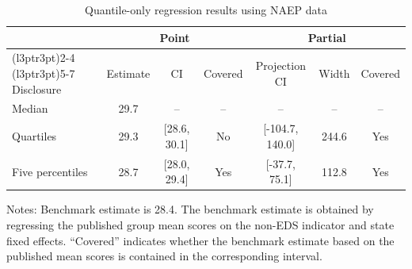 \begin{table}[!h]
\centering
\begin{threeparttable}
\caption{\label{tab:naep_qonlyreg}Quantile-only regression results using NAEP data}
\centering
{
\renewcommand{\arraystretch}{1.8}
\begin{tabular}[t]{lcccccc}
\toprule
\multicolumn{1}{c}{ } & \multicolumn{3}{c}{Point} & \multicolumn{3}{c}{Partial} \\
\cmidrule(l{3pt}r{3pt}){2-4} \cmidrule(l{3pt}r{3pt}){5-7}
Disclosure & Estimate & CI & Covered & Projection CI & Width & Covered\\
\midrule
Median & 29.7 & -- & -- & -- & -- & --\\
Quartiles & 29.3 & {}[28.6, 30.1] & No & {}[-104.7, 140.0] & 244.6 & Yes\\
Five percentiles & 28.7 & {}[28.0, 29.4] & Yes & {}[-37.7, 75.1] & 112.8 & Yes\\
\bottomrule
\end{tabular}
}
\begin{tablenotes}[flushleft]
{}
\item Notes: Benchmark estimate is 28.4. The benchmark estimate is obtained by regressing the published group mean scores on the non-EDS indicator and state fixed effects. “Covered” indicates whether the benchmark estimate
  based on the published mean scores is contained
  in the corresponding interval.
\end{tablenotes}
\end{threeparttable}
\end{table}
